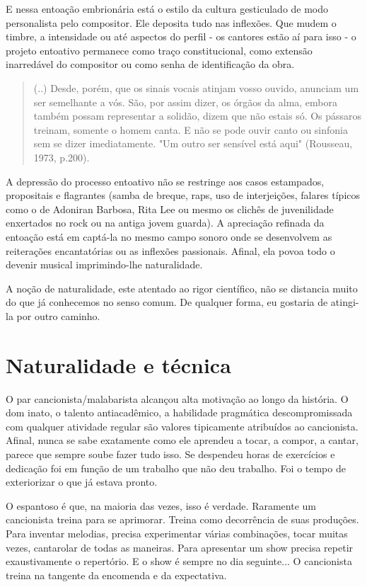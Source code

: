 E nessa entoação embrionária está o estilo da cultura gesticulado de
modo personalista pelo compositor. Ele deposita tudo nas inflexões. Que
mudem o timbre, a intensidade ou até aspectos do perfil - os cantores
estão aí para isso - o projeto entoativo permanece como traço
constitucional, como extensão inarredável do compositor ou como senha de
identificação da obra.

\begin{quote}
(..) Desde, porém, que os sinais vocais atinjam vosso ouvido, anunciam
um ser semelhante a vós. São, por assim dizer, os órgãos da alma, embora
também possam representar a solidão, dizem que não estais só. Os
pássaros treinam, somente o homem canta. E não se pode ouvir canto ou
sinfonia sem se dizer imediatamente. "Um outro ser sensível está aqui"
(Rousseau, 1973, p.200).~
\end{quote}

A depressão do processo entoativo não se restringe aos casos estampados,
propositais e flagrantes (samba de breque, raps, uso de interjeições,
falares típicos como o de Adoniran Barbosa, Rita Lee ou mesmo os clichês
de juvenilidade enxertados no rock ou na antiga jovem guarda). A
apreciação refinada da entoação está em captá-la no mesmo campo sonoro
onde se desenvolvem as reiterações encantatórias ou as inflexões
passionais. Afinal, ela povoa todo o devenir musical imprimindo-lhe
naturalidade.

A noção de naturalidade, este atentado ao rigor científico, não se
distancia muito do que já conhecemos no senso comum. De qualquer forma,
eu gostaria de atingi-la por outro caminho.~

\section{Naturalidade e técnica}

O par cancionista/malabarista alcançou alta motivação ao longo da
história. O dom inato, o talento antiacadêmico, a habilidade pragmática
descompromissada com qualquer atividade regular são valores tipicamente
atribuídos ao cancionista. Afinal, nunca se sabe exatamente como ele
aprendeu a tocar, a compor, a cantar, parece que sempre soube fazer tudo
isso. Se despendeu horas de exercícios e dedicação foi em função de um
trabalho que não deu trabalho. Foi o tempo de exteriorizar o que já
estava pronto.

O espantoso é que, na maioria das vezes, isso é verdade. Raramente um
cancionista treina para se aprimorar. Treina como decorrência de suas
produções. Para inventar melodias, precisa experimentar várias
combinações, tocar muitas vezes, cantarolar de todas as maneiras. Para
apresentar um show precisa repetir exaustivamente o repertório. E o show
é sempre no dia seguinte... O cancionista treina na tangente da
encomenda e da expectativa.

